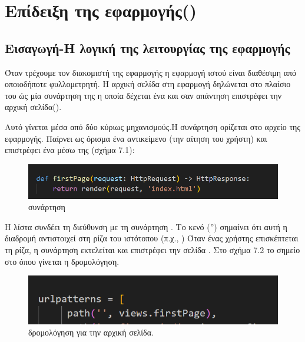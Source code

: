 \chapter{Επίδειξη της εφαρμογής()}

\section{Εισαγωγή-Η λογική της λειτουργίας της εφαρμογής }

Όταν τρέχουμε τον διακομιστή της εφαρμογής η εφαρμογή ιστού
είναι διαθέσιμη από οποιοδήποτε φυλλομετρητή. Η αρχική σελίδα στη εφαρμογή
 δηλώνεται στο πλαίσιο του  ώς μία συνάρτηση της 
η οποία δέχεται ένα  και σαν απάντηση επιστρέφει την αρχική σελίδα().

Αυτό γίνεται μέσα από δύο κύριως μηχανισμούς.Η συνάρτηση  ορίζεται στο αρχείο  της εφαρμογής. Παίρνει ως όρισμα ένα αντικείμενο  
(την αίτηση του χρήστη) και επιστρέφει ένα  μέσω της (σχήμα 7.1):

\FloatBarrier
\begin{figure}[h]
	\centering
	\includegraphics[width=1.0\textwidth]{graphics/firstPage.png}
	\caption{  συνάρτηση}
\end{figure}

\FloatBarrier

Η λίστα  συνδέει τη διεύθυνση  
με τη συνάρτηση . Το κενό  ('') σημαίνει ότι αυτή η διαδρομή αντιστοιχεί στη ρίζα του ιστότοπου (π.χ., )
Όταν ένας χρήστης επισκέπτεται τη ρίζα, η συνάρτηση  
εκτελείται και επιστρέφει την  σελίδα . Στο σχήμα 7.2 το σημείο στο  όπου γίνεται η δρομολόγηση.

\FloatBarrier

\begin{figure}[h]
	\centering
	\includegraphics[width=1.0\textwidth]{graphics/urls_firstPage.png}
	\caption{  δρομολόγηση για την αρχική σελίδα.}
\end{figure}

